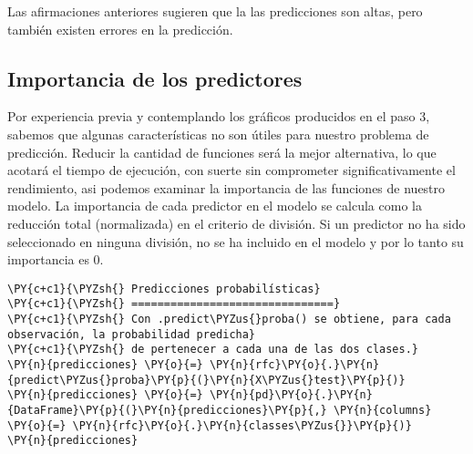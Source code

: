Las afirmaciones anteriores sugieren que la las predicciones son altas,
pero también existen errores en la predicción.

    \hypertarget{importancia-de-los-predictores}{%
\subsection{Importancia de los
predictores}\label{importancia-de-los-predictores}}

Por experiencia previa y contemplando los gráficos producidos en el paso
3, sabemos que algunas características no son útiles para nuestro
problema de predicción. Reducir la cantidad de funciones será la mejor
alternativa, lo que acotará el tiempo de ejecución, con suerte sin
comprometer significativamente el rendimiento, asi podemos examinar la
importancia de las funciones de nuestro modelo. La importancia de cada
predictor en el modelo se calcula como la reducción total (normalizada)
en el criterio de división. Si un predictor no ha sido seleccionado en
ninguna división, no se ha incluido en el modelo y por lo tanto su
importancia es 0.

    \begin{tcolorbox}[breakable, size=fbox, boxrule=1pt, pad at break*=1mm,colback=cellbackground, colframe=cellborder]
\begin{Verbatim}[commandchars=\\\{\}]
\PY{c+c1}{\PYZsh{} Predicciones probabilísticas}
\PY{c+c1}{\PYZsh{} ===============================}
\PY{c+c1}{\PYZsh{} Con .predict\PYZus{}proba() se obtiene, para cada observación, la probabilidad predicha}
\PY{c+c1}{\PYZsh{} de pertenecer a cada una de las dos clases.}
\PY{n}{predicciones} \PY{o}{=} \PY{n}{rfc}\PY{o}{.}\PY{n}{predict\PYZus{}proba}\PY{p}{(}\PY{n}{X\PYZus{}test}\PY{p}{)}
\PY{n}{predicciones} \PY{o}{=} \PY{n}{pd}\PY{o}{.}\PY{n}{DataFrame}\PY{p}{(}\PY{n}{predicciones}\PY{p}{,} \PY{n}{columns} \PY{o}{=} \PY{n}{rfc}\PY{o}{.}\PY{n}{classes\PYZus{}}\PY{p}{)}
\PY{n}{predicciones}
\end{Verbatim}
\end{tcolorbox}

